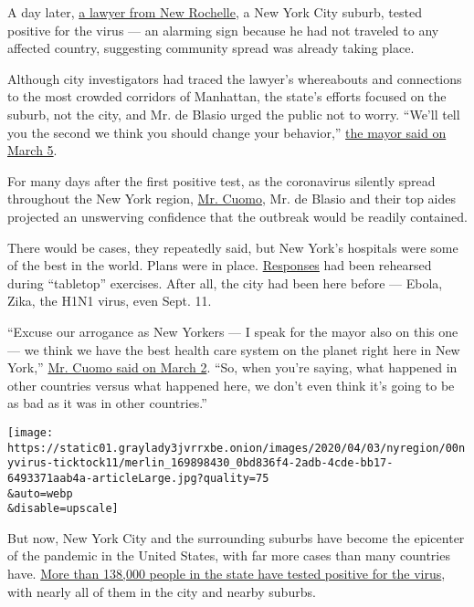 A day later,
\href{https://www.nytimes3xbfgragh.onion/2020/03/03/nyregion/coronavirus-new-york-state.html}{a
lawyer from New Rochelle}, a New York City suburb, tested positive for
the virus --- an alarming sign because he had not traveled to any
affected country, suggesting community spread was already taking place.

Although city investigators had traced the lawyer's whereabouts and
connections to the most crowded corridors of Manhattan, the state's
efforts focused on the suburb, not the city, and Mr. de Blasio urged the
public not to worry. ``We'll tell you the second we think you should
change your behavior,''
\href{https://www.nytimes3xbfgragh.onion/2020/03/05/nyregion/coronavirus-new-york-cases.html}{the
mayor said on March 5}.

For many days after the first positive test, as the coronavirus silently
spread throughout the New York region,
\href{https://www.nytimes3xbfgragh.onion/2020/04/09/style/cuomo-ny-tough-video-coronavirus.html}{Mr.
Cuomo}, Mr. de Blasio and their top aides projected an unswerving
confidence that the outbreak would be readily contained.

There would be cases, they repeatedly said, but New York's hospitals
were some of the best in the world. Plans were in place.
\href{https://www.nytimes3xbfgragh.onion/2020/07/13/upshot/coronavirus-response-fax-machines.html}{Responses}
had been rehearsed during ``tabletop'' exercises. After all, the city
had been here before --- Ebola, Zika, the H1N1 virus, even Sept. 11.

``Excuse our arrogance as New Yorkers --- I speak for the mayor also on
this one --- we think we have the best health care system on the planet
right here in New York,''
\href{https://www.governor.ny.gov/news/video-audio-photos-rush-transcript-novel-coronavirus-briefing-governor-cuomo-announces-state}{Mr.
Cuomo said on March 2}. ``So, when you're saying, what happened in other
countries versus what happened here, we don't even think it's going to
be as bad as it was in other countries.''

\texttt{[image: https://static01.graylady3jvrrxbe.onion/images/2020/04/03/nyregion/00nyvirus-ticktock11/merlin\_169898430\_0bd836f4-2adb-4cde-bb17-6493371aab4a-articleLarge.jpg?quality=75\\\&auto=webp\\\&disable=upscale]}

But now, New York City and the surrounding suburbs have become the
epicenter of the pandemic in the United States, with far more cases than
many countries have.
\href{https://www.nytimes3xbfgragh.onion/2020/04/07/nyregion/coronavirus-new-york-update.html}{More
than 138,000 people in the state have tested positive for the virus},
with nearly all of them in the city and nearby suburbs.

